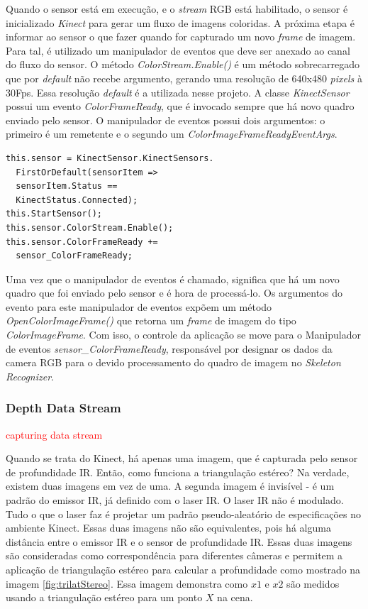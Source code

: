 Quando o sensor está em execução, e o \textit{stream} RGB está habilitado, o sensor é inicializado  \textit{Kinect} para gerar um fluxo de imagens coloridas. A próxima etapa é informar ao sensor o que fazer quando for capturado um novo \textit{frame} de imagem. Para tal, é utilizado um manipulador de eventos que deve ser anexado ao canal do fluxo do sensor. O método \textit{ColorStream.Enable()} é um método sobrecarregado que por \textit{default} não recebe argumento, gerando uma resolução de  640x480 \textit{pixels} à 30Fps. Essa resolução \textit{default} é a utilizada nesse projeto. A classe \textit{KinectSensor} possui um evento \textit{ColorFrameReady}, que é invocado sempre que há novo quadro enviado pelo sensor. O manipulador de eventos possui dois argumentos: o primeiro é um remetente e o segundo um \textit{ColorImageFrameReadyEventArgs}.

\begin{verbatim}
this.sensor = KinectSensor.KinectSensors.
  FirstOrDefault(sensorItem => 
  sensorItem.Status == 
  KinectStatus.Connected);
this.StartSensor();
this.sensor.ColorStream.Enable();
this.sensor.ColorFrameReady += 
  sensor_ColorFrameReady;
\end{verbatim}


Uma vez que o manipulador de eventos é chamado, significa que há um novo quadro que foi enviado pelo sensor e é hora de processá-lo. Os argumentos do evento para este manipulador de eventos expõem um método \textit{OpenColorImageFrame()} que retorna um \textit{frame} de imagem do tipo \textit{ColorImageFrame}. Com isso, o controle da aplicação se move para o Manipulador de eventos \textit{sensor\_ColorFrameReady}, responsável por designar os dados da camera RGB para o devido  processamento do quadro de imagem no \textit{Skeleton Recognizer}. 




\subsubsection{Depth Data Stream}\label{sec:depthDataStream}
\textcolor{red}{capturing data stream}

Quando se trata do Kinect, há apenas uma imagem, que é capturada pelo sensor de profundidade IR. Então, como funciona a triangulação estéreo? Na verdade, existem duas imagens em vez de uma. A segunda imagem é invisível - é um padrão do emissor IR, já definido com o laser IR. O laser IR não é modulado. Tudo o que o laser faz é projetar um padrão pseudo-aleatório de especificações no ambiente Kinect. Essas duas imagens não são equivalentes, pois há alguma distância entre o emissor IR e o sensor de profundidade IR. Essas duas imagens são consideradas como correspondência para diferentes câmeras e permitem a aplicação de triangulação estéreo para calcular a profundidade como mostrado na imagem \ref{fig:trilatStereo}. Essa imagem demonstra como $x1$ e $x2$ são medidos usando a triangulação estéreo para um ponto $X$ na cena. 

